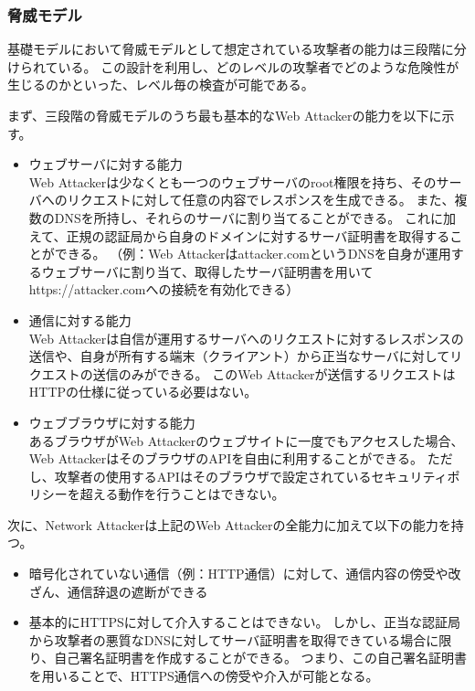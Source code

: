 \documentclass[12pt,a4paper]{jbook}
\begin{document}
\subsubsection{脅威モデル}
基礎モデルにおいて脅威モデルとして想定されている攻撃者の能力は三段階に分けられている。
この設計を利用し、どのレベルの攻撃者でどのような危険性が生じるのかといった、レベル毎の検査が可能である。

まず、三段階の脅威モデルのうち最も基本的なWeb Attackerの能力を以下に示す。
\begin{itemize}
\item ウェブサーバに対する能力 \\
Web Attackerは少なくとも一つのウェブサーバのroot権限を持ち、そのサーバへのリクエストに対して任意の内容でレスポンスを生成できる。
また、複数のDNSを所持し、それらのサーバに割り当てることができる。
これに加えて、正規の認証局から自身のドメインに対するサーバ証明書を取得することができる。
（例：Web Attackerはattacker.comというDNSを自身が運用するウェブサーバに割り当て、取得したサーバ証明書を用いてhttps://attacker.comへの接続を有効化できる）
\item 通信に対する能力 \\
Web Attackerは自信が運用するサーバへのリクエストに対するレスポンスの送信や、自身が所有する端末（クライアント）から正当なサーバに対してリクエストの送信のみができる。
このWeb Attackerが送信するリクエストはHTTPの仕様に従っている必要はない。
\item ウェブブラウザに対する能力 \\
あるブラウザがWeb Attackerのウェブサイトに一度でもアクセスした場合、Web AttackerはそのブラウザのAPIを自由に利用することができる。
ただし、攻撃者の使用するAPIはそのブラウザで設定されているセキュリティポリシーを超える動作を行うことはできない。
\end{itemize}

次に、Network Attackerは上記のWeb Attackerの全能力に加えて以下の能力を持つ。
\begin{itemize}
\item 暗号化されていない通信（例：HTTP通信）に対して、通信内容の傍受や改ざん、通信辞退の遮断ができる
\item 基本的にHTTPSに対して介入することはできない。
しかし、正当な認証局から攻撃者の悪質なDNSに対してサーバ証明書を取得できている場合に限り、自己署名証明書を作成することができる。
つまり、この自己署名証明書を用いることで、HTTPS通信への傍受や介入が可能となる。
\end{itemize}
\end{document}
